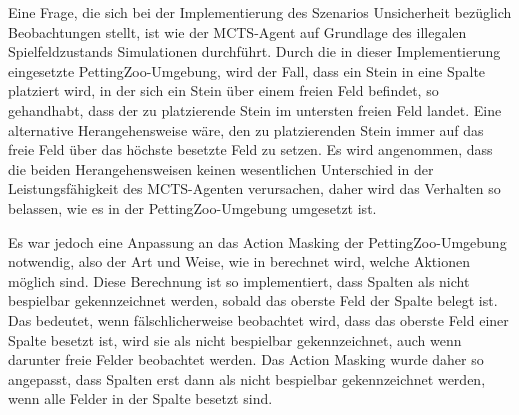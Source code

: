 \endgroup

Eine Frage, die sich bei der Implementierung des Szenarios Unsicherheit bezüglich Beobachtungen stellt, ist wie der MCTS-Agent auf Grundlage des illegalen Spielfeldzustands Simulationen durchführt. Durch die in dieser Implementierung eingesetzte PettingZoo-Umgebung, wird der Fall, dass ein Stein in eine Spalte platziert wird, in der sich ein Stein über einem freien Feld befindet, so gehandhabt, dass der zu platzierende Stein im untersten freien Feld landet. Eine alternative Herangehensweise wäre, den zu platzierenden Stein immer auf das freie Feld über das höchste besetzte Feld zu setzen. Es wird angenommen, dass die beiden Herangehensweisen keinen wesentlichen Unterschied in der Leistungsfähigkeit des MCTS-Agenten verursachen, daher wird das Verhalten so belassen, wie es in der PettingZoo-Umgebung umgesetzt ist.

Es war jedoch eine Anpassung an das Action Masking der PettingZoo-Umgebung notwendig, also der Art und Weise, wie in berechnet wird, welche Aktionen möglich sind. Diese Berechnung ist so implementiert, dass Spalten als nicht bespielbar gekennzeichnet werden, sobald das oberste Feld der Spalte belegt ist. Das bedeutet, wenn fälschlicherweise beobachtet wird, dass das oberste Feld einer Spalte besetzt ist, wird sie als nicht bespielbar gekennzeichnet, auch wenn darunter freie Felder beobachtet werden. Das Action Masking wurde daher so angepasst, dass Spalten erst dann als nicht bespielbar gekennzeichnet werden, wenn alle Felder in der Spalte besetzt sind.
